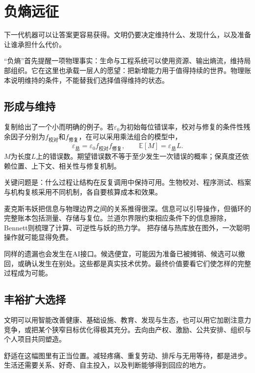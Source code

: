 \section{负熵远征}

下一代机器可以让答案更容易获得。文明仍要决定维持什么、发现什么，以及准备让谁承担什么代价。

“负熵”首先提醒一项物理事实：生命与工程系统可以使用资源、输出熵流，维持局部组织。它在这里也承载一层人的愿望：把新增能力用于值得持续的世界。物理账本说明维持的条件，不能替我们选择值得维持的状态。

\subsection{形成与维持}

复制给出了一个小而明确的例子。若$\varepsilon_0$为初始每位错误率，校对与修复的条件性残余因子分别为$f_{\text{校对}}$和$f_{\text{修复}}$，在可以采用乘法组合的模型中，
\begin{equation}
\varepsilon_{\text{总}}=\varepsilon_0f_{\text{校对}}f_{\text{修复}},
\qquad
\mathbb E[M]=\varepsilon_{\text{总}}L .
\end{equation}
$M$为长度$L$上的错误数。期望错误数不等于至少发生一次错误的概率；保真度还依赖位置、上下文、相关性与修复机制。\cite{kunkel2000dna}

关键问题是：什么过程让结构在反复调用中保持可用。生物校对、程序测试、档案与机构复核采用不同机制，各自要核算成本和效果。

麦克斯韦妖把信息与物理边界之间的关系推得很深。信息可以引导操作，但循环的完整账本包括测量、存储与复位。兰道尔界限约束相应条件下的信息擦除，Bennett则梳理了计算、可逆性与妖的热力学。\cite{landauer1961,bennett1982thermodynamics} 把存储与热库放在图外，一次聪明操作就可能显得免费。

同样的遗漏也会发生在AI接口。候选便宜，可能因为准备已被摊销、候选可以撤回，或确认发生在别处。这些都是真实技术优势。最终价值要看它们使怎样的完整过程成为可能。

\subsection{丰裕扩大选择}

文明可以用智能改善健康、基础设施、教育、发现与生态，也可以用它加剧注意力竞争，或把某个狭窄目标优化得极其充分。去向由产权、激励、公共安排、组织与个人项目共同塑造。

舒适在这幅图里有正当位置。减轻疼痛、重复劳动、排斥与无用等待，都是进步。生活还需要关系、好奇、自主投入，以及判断能够得到回应的地方。

